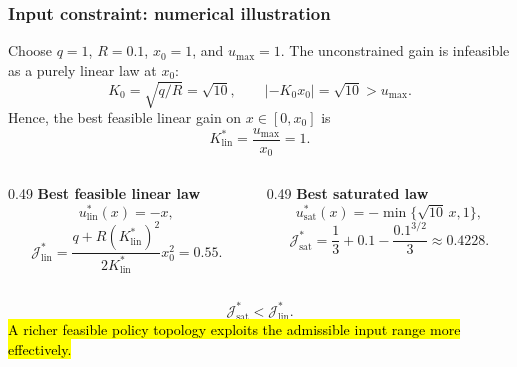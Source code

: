 \begin{frame}
	\frametitle{Input constraint: numerical illustration}
	Choose $q=1$, $R=0.1$, $x_0=1$, and $u_{\max}=1$.
	The unconstrained gain is infeasible as a purely linear law at $x_0$:
	\begin{equation*}
		K_0=\sqrt{q/R}=\sqrt{10},
		\qquad
		|{-K_0x_0}|=\sqrt{10}>u_{\max}.
	\end{equation*}\pause%
	Hence, the best feasible linear gain on $x\in[0,x_0]$ is
	\begin{equation*}
		K_{\mathrm{lin}}^*=\frac{u_{\max}}{x_0}=1 .
	\end{equation*}\pause%
	\begin{columns}[T,onlytextwidth]
		\begin{column}{0.49\textwidth}
			\textbf{Best feasible linear law}
			\begin{equation*}
				u_{\mathrm{lin}}^*(x)=-x,
			\end{equation*}
			\begin{equation*}
				\mathcal{J}_{\mathrm{lin}}^*
				=\frac{q+R(K_{\mathrm{lin}}^*)^2}
				{2K_{\mathrm{lin}}^*}x_0^2
				=0.55 .
			\end{equation*}
		\end{column}\pause%
		\begin{column}{0.49\textwidth}
			\textbf{Best saturated law}
			\begin{equation*}
				u_{\mathrm{sat}}^*(x)=-\min\{\sqrt{10}\,x,1\},
			\end{equation*}
			\begin{equation*}
				\mathcal{J}_{\mathrm{sat}}^*
				=\frac{1}{3}+0.1-\frac{0.1^{3/2}}{3}
				\approx0.4228 .
			\end{equation*}
		\end{column}
	\end{columns}\pause%
	\begin{equation*}
		\boxed{\mathcal{J}_{\mathrm{sat}}^*<\mathcal{J}_{\mathrm{lin}}^*.}
	\end{equation*}
	\hl{A richer feasible policy topology exploits the admissible input range more effectively.}
\end{frame}


